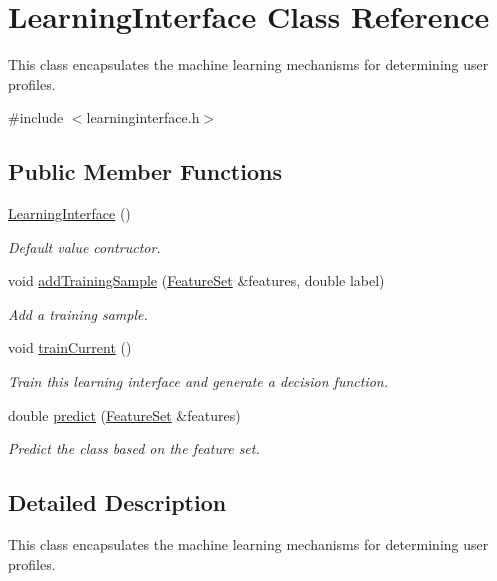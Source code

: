 \hypertarget{classLearningInterface}{\section{Learning\-Interface Class Reference}
\label{classLearningInterface}
}


This class encapsulates the machine learning mechanisms for determining user profiles.  




{\ttfamily \#include $<$learninginterface.\-h$>$}

\subsection*{Public Member Functions}
\begin{DoxyCompactItemize}
\item 
\hyperlink{classLearningInterface_a96651ae0d66b5d2516957c94accc4faa}{Learning\-Interface} ()
\begin{DoxyCompactList}\small\item\em Default value contructor. \end{DoxyCompactList}\item 
void \hyperlink{classLearningInterface_ac34bceb3772c7f5b02bd6561e9fab5d2}{add\-Training\-Sample} (\hyperlink{classFeatureSet}{Feature\-Set} \&features, double label)
\begin{DoxyCompactList}\small\item\em Add a training sample. \end{DoxyCompactList}\item 
void \hyperlink{classLearningInterface_a47150d5bbe0918f695b359d2bc7e250f}{train\-Current} ()
\begin{DoxyCompactList}\small\item\em Train this learning interface and generate a decision function. \end{DoxyCompactList}\item 
double \hyperlink{classLearningInterface_aa4ef0ef5a70ee33dbc5a9bcf67ba98a3}{predict} (\hyperlink{classFeatureSet}{Feature\-Set} \&features)
\begin{DoxyCompactList}\small\item\em Predict the class based on the feature set. \end{DoxyCompactList}\end{DoxyCompactItemize}


\subsection{Detailed Description}
This class encapsulates the machine learning mechanisms for determining user profiles. 

